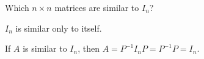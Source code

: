 \documentclass{ximera}
\begin{document}
\begin{exercise} \label{c6.5.5}
Which $n\times n$ matrices are similar to $I_n$?

\begin{solution}

\ans $I_n$ is similar only to itself.

\soln If $A$ is similar to $I_n$, then $A = P^{-1}I_nP = P^{-1}P = I_n$.

\end{solution}
\end{exercise}
\end{document}
